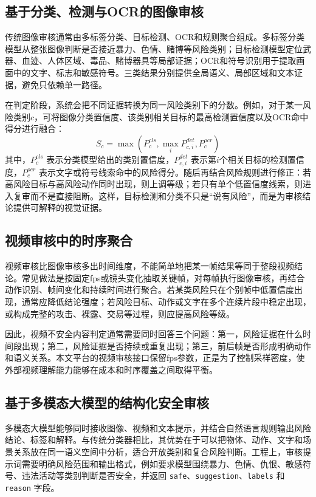 \subsection{基于分类、检测与OCR的图像审核}

传统图像审核通常由多标签分类、目标检测、OCR和规则聚合组成。多标签分类模型从整张图像判断是否接近暴力、色情、赌博等风险类别；目标检测模型定位武器、血迹、人体区域、毒品、赌博器具等局部证据；OCR和符号识别用于提取画面中的文字、标志和敏感符号。三类结果分别提供全局语义、局部区域和文本证据，避免只依赖单一路径。

在判定阶段，系统会把不同证据转换为同一风险类别下的分数。例如，对于某一风险类别$c$，可将图像分类置信度、该类别相关目标的最高检测置信度以及OCR命中得分进行融合：
\[
S_c=\max(P_c^{cls}, \max_i P_{c,i}^{det}, P_c^{ocr})
\]
其中，$P_c^{cls}$ 表示分类模型给出的类别置信度，$P_{c,i}^{det}$ 表示第$i$个相关目标的检测置信度，$P_c^{ocr}$ 表示文字或符号线索命中的风险得分。随后再结合风险规则进行修正：若高风险目标与高风险动作同时出现，则上调等级；若只有单个低置信度线索，则进入复审而不是直接阻断。这样，目标检测和分类不只是“说有风险”，而是为审核结论提供可解释的视觉证据。

\subsection{视频审核中的时序聚合}

视频审核比图像审核多出时间维度，不能简单地把某一帧结果等同于整段视频结论。常见做法是按固定fps或镜头变化抽取关键帧，对每帧执行图像审核，再结合动作识别、帧间变化和持续时间进行聚合。若某类风险只在个别帧中低置信度出现，通常应降低结论强度；若风险目标、动作或文字在多个连续片段中稳定出现，或构成完整的攻击、裸露、交易等过程，则应提高风险等级。

因此，视频不安全内容判定通常需要同时回答三个问题：第一，风险证据在什么时间段出现；第二，风险证据是否持续或重复出现；第三，前后帧是否形成明确动作和语义关系。本文平台的视频审核接口保留fps参数，正是为了控制采样密度，使外部视频理解能力能够在成本和时序覆盖之间取得平衡。

\subsection{基于多模态大模型的结构化安全审核}

多模态大模型能够同时接收图像、视频和文本提示，并结合自然语言规则输出风险结论、标签和解释。与传统分类器相比，其优势在于可以把物体、动作、文字和场景关系放在同一语义空间中分析，适合开放类别和复合风险判断。工程上，审核提示词需要明确风险范围和输出格式，例如要求模型围绕暴力、色情、仇恨、敏感符号、违法活动等类别判断是否安全，并返回 \texttt{safe}、\texttt{suggestion}、\texttt{labels} 和 \texttt{reason} 字段。

